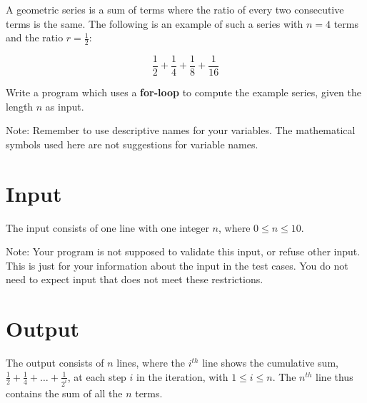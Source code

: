 
\noindent
A geometric series is a sum of terms where the ratio of every two consecutive terms is the same.
The following is an example of such a series with $n=4$ terms and the ratio $r=\frac{1}{2}$:

\[
\frac{1}{2} + \frac{1}{4} + \frac{1}{8} + \frac{1}{16}
\]

\noindent
Write a program which uses a \textbf{for-loop} to compute the example series, given the length $n$ as input. \\
\noindent

Note: Remember to use descriptive names for your variables.
The mathematical symbols used here are not suggestions for variable names.

\section*{Input}
The input consists of one line with one integer $n$, where $0 \leq n \leq 10$.

Note: Your program is not supposed to validate this input, or refuse other input.
This is just for your information about the input in the test cases.
You do not need to expect input that does not meet these restrictions.

\section*{Output}
The output consists of $n$ lines, where the $i^{th}$ line shows the cumulative sum,
$\frac{1}{2} + \frac{1}{4} + \dots + \frac{1}{2^i}$, at each step $i$ in the iteration, with $1 \leq i \leq n$.
The $n^{th}$ line thus contains the sum of all the $n$ terms.
